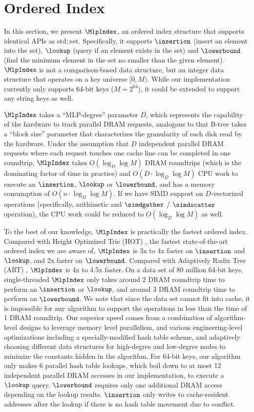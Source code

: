 \documentclass[11pt, usletter]{article}
\begin{document}
\section{Ordered Index} \label{orderedindex}

In this section, we present $\MlpIndex$, an ordered index structure that supports identical APIs as std::set.
Specifically, it supports $\insertion$ (insert an element into the set), $\lookup$ (query if an element exists in the set) 
and $\lowerbound$ (find the minimum element in the set no smaller than the given element).
$\MlpIndex$ is not a comparison-based data structure, but an integer data structure that operates on a key universe $[0,M)$.
While our implementation currently only supports 64-bit keys ($M=2^{64}$), it could be extended to support any string keys as well.

$\MlpIndex$ takes a ``MLP-degree'' parameter $D$, 
which represents the capability of the hardware to track parallel DRAM requests, 
analogous to that B-tree takes a ``block size'' parameter that characterizes the granularity of each disk read by the hardware.
Under the assumption that $D$ independent parallel DRAM requests where each request touches one cache line can be completed in one roundtrip,
$\MlpIndex$ takes $O(\log_D\log M)$ DRAM roundtrips (which is the dominating factor of time in practice) 
and $O(D\cdot\log_D\log M)$ CPU work to execute an $\insertion$, $\lookup$ or $\lowerbound$,
and has a memory consumption of $O(n\cdot \log_D\log M)$.
If we have SIMD support on $D$-vectorized operations (specifically, arithimetic and $\simdgather$ / $\simdscatter$ operation), 
the CPU work could be reduced to $O(\log_D\log M)$ as well.

To the best of our knowledge, $\MlpIndex$ is practically the fastest ordered index. 
Compared with Height Optimized Trie (HOT) \cite{hot_sigmod18}, 
the fastest state-of-the-art ordered index we are aware of, 
$\MlpIndex$ is 3x to 4x faster on $\insertion$ and $\lookup$, 
and 2x faster on $\lowerbound$.
Compared with Adaptively Radix Tree (ART) \cite{arttrie_icde13}, $\MlpIndex$ is 4x to 4.5x faster. 
On a data set of 80 million 64-bit keys, single-threaded $\MlpIndex$ only takes around 2 DRAM roundtrip time to perform 
an $\insertion$ or $\lookup$, and around 3 DRAM roundtrip time to perform an $\lowerbound$.
We note that since the data set cannot fit into cache, 
it is impossible for any algorithm to support the operations in less than the time of 1 DRAM roundtrip.
Our superior speed 
comes from a combination of algorithm-level designs to leverage memory level parallelism, 
and various engineering-level optimizations including a specially-modified hash table scheme, 
and adaptively choosing different data structures for high-degree and low-degree nodes 
to minimize the constants hidden in the algorithm.
For 64-bit keys, our algorithm only makes 6 parallel hash table lookups, 
which boil down to at most 12 independent parallel DRAM accesses in our implementation,
to execute a $\lookup$ query. $\lowerbound$ requires only one additional DRAM access
depending on the lookup results. 
$\insertion$ only writes to cache-resident addresses after the lookup 
if there is no hash table movement due to conflict.
\end{document}
